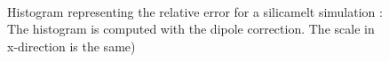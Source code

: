 \documentclass[11pt,twoside,a4paper]{report}
\begin{document}
\begin{figure}[H]
  \label{fig:histogram}
    \centering  
 \\    
  
    \caption{Histogram representing the relative error for a silicamelt simulation : The histogram is computed with the dipole correction. The scale in x-direction is the same)}    
   \end{figure}   
\end{document}
